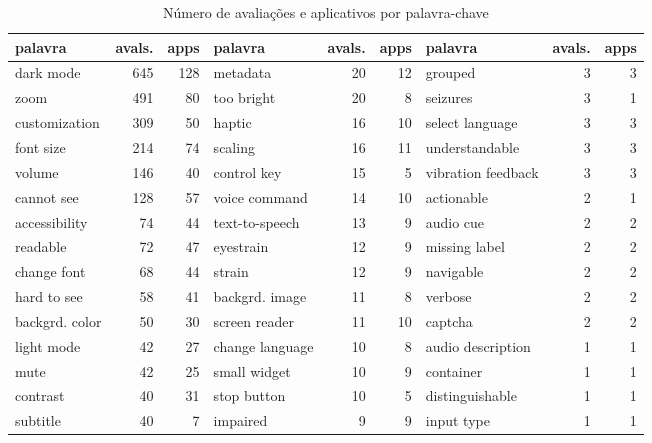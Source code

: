 \begin{table}[!htb]
\centering
\small
\setlength{\tabcolsep}{3pt}
\caption{Número de avaliações e aplicativos por palavra-chave}
\label{tab:keywords-reviews}
\begin{tabular}{lrr||lrr||lrr}
\hline
palavra          & avals. & apps & palavra          & avals. & apps &  palavra            & avals. & apps \\
\hline
dark mode        & 645     & 128  & metadata         & 20      & 12   & grouped            & 3       & 3    \\
zoom             & 491     & 80   & too bright       & 20      & 8    & seizures           & 3       & 1    \\
customization    & 309     & 50   & haptic           & 16      & 10   & select language    & 3       & 3    \\
font size        & 214     & 74   & scaling          & 16      & 11   & understandable     & 3       & 3    \\
volume           & 146     & 40   & control key      & 15      & 5    & vibration feedback & 3       & 3    \\
cannot see       & 128     & 57   & voice command    & 14      & 10   & actionable         & 2       & 1    \\
accessibility    & 74      & 44   & text-to-speech   & 13      & 9    & audio cue          & 2       & 2    \\
readable         & 72      & 47   & eyestrain        & 12      & 9    & missing label      & 2       & 2    \\
change font      & 68      & 44   & strain           & 12      & 9    & navigable          & 2       & 2    \\
hard to see      & 58      & 41   & backgrd. image & 11      & 8    & verbose            & 2       & 2    \\
backgrd. color   & 50      & 30   & screen reader    & 11      & 10   & captcha            & 2       & 2    \\
light mode       & 42      & 27   & change language  & 10      & 8    & audio description  & 1       & 1    \\
mute             & 42      & 25   & small widget     & 10      & 9    & container          & 1       & 1    \\
contrast         & 40      & 31   & stop button      & 10      & 5    & distinguishable    & 1       & 1    \\
subtitle         & 40      & 7    & impaired         & 9       & 9    & input type         & 1       & 1    \\

\end{tabular}
\end{table}
